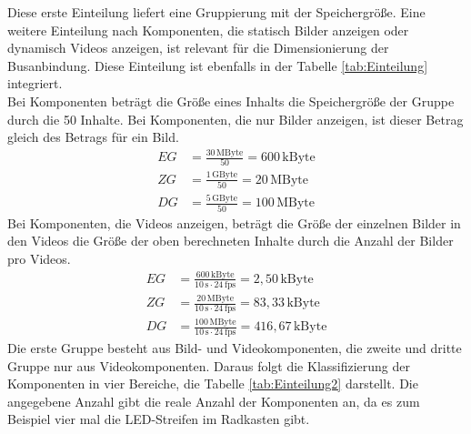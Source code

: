 Diese erste Einteilung liefert eine Gruppierung mit der Speichergröße. Eine weitere Einteilung nach Komponenten, die statisch Bilder anzeigen oder dynamisch Videos anzeigen, ist relevant für die Dimensionierung der Busanbindung. Diese Einteilung ist ebenfalls in der Tabelle \ref{tab:Einteilung} integriert. \\
Bei Komponenten beträgt die Größe eines Inhalts die Speichergröße der Gruppe durch die 50 Inhalte. Bei Komponenten, die nur Bilder anzeigen, ist dieser Betrag gleich des Betrags für ein Bild.
\begin{align}
	EG &= \frac{30\,\mathrm{MByte}}{50} = 600\,\mathrm{kByte} \\
	ZG &= \frac{1\,\mathrm{GByte}}{50} =  20\,\mathrm{MByte} \\
	DG &= \frac{5\,\mathrm{GByte}}{50} = 100\,\mathrm{MByte}
\end{align}
Bei Komponenten, die Videos anzeigen, beträgt die Größe der einzelnen Bilder in den Videos die Größe der oben berechneten Inhalte durch die Anzahl der Bilder pro Videos.
\begin{align}
	EG &= \frac{600\,\mathrm{kByte}}{10\,\mathrm{s} \cdot 24\,\mathrm{fps}} = 2,50\,\mathrm{kByte} \\
	ZG &= \frac{20\,\mathrm{MByte}}{10\,\mathrm{s} \cdot 24\,\mathrm{fps}} = 83,33\,\mathrm{kByte} \\
	DG &= \frac{100\,\mathrm{MByte}}{10\,\mathrm{s} \cdot 24\,\mathrm{fps}} = 416,67\,\mathrm{kByte}
\end{align}
Die erste Gruppe besteht aus Bild- und Videokomponenten, die zweite und dritte Gruppe nur aus Videokomponenten. Daraus folgt die Klassifizierung der Komponenten in vier Bereiche, die Tabelle \ref{tab:Einteilung2} darstellt. Die angegebene Anzahl gibt die reale Anzahl der Komponenten an, da es zum Beispiel vier mal die LED-Streifen im Radkasten gibt.
